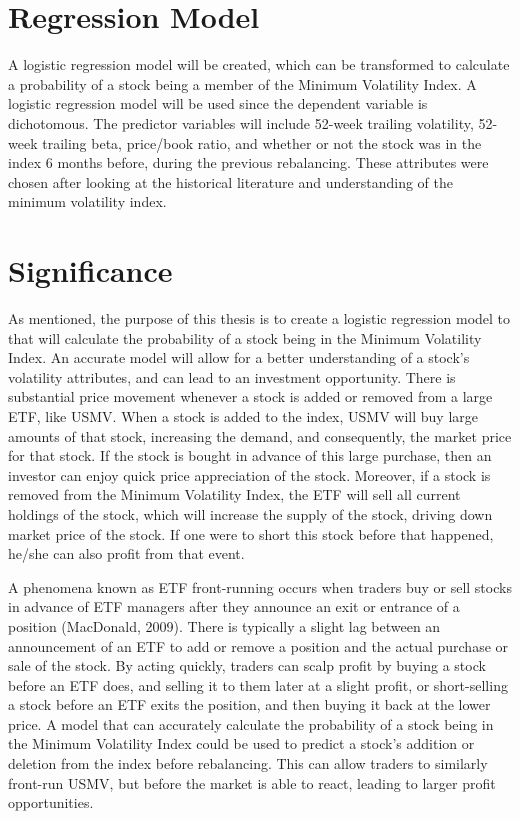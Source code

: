 \documentclass[12pt,twoside]{reedthesis}
\theoremstyle{definition}
\theoremstyle{definition}
\theoremstyle{definition}
\theoremstyle{remark}
\begin{document}
\section{Regression Model}\label{regression-model}

A logistic regression model will be created, which can be transformed to
calculate a probability of a stock being a member of the Minimum
Volatility Index. A logistic regression model will be used since the
dependent variable is dichotomous. The predictor variables will include
52-week trailing volatility, 52-week trailing beta, price/book ratio,
and whether or not the stock was in the index 6 months before, during
the previous rebalancing. These attributes were chosen after looking at
the historical literature and understanding of the minimum volatility
index.

\section{Significance}\label{significance}

As mentioned, the purpose of this thesis is to create a logistic
regression model to that will calculate the probability of a stock being
in the Minimum Volatility Index. An accurate model will allow for a
better understanding of a stock's volatility attributes, and can lead to
an investment opportunity. There is substantial price movement whenever
a stock is added or removed from a large ETF, like USMV. When a stock is
added to the index, USMV will buy large amounts of that stock,
increasing the demand, and consequently, the market price for that
stock. If the stock is bought in advance of this large purchase, then an
investor can enjoy quick price appreciation of the stock. Moreover, if a
stock is removed from the Minimum Volatility Index, the ETF will sell
all current holdings of the stock, which will increase the supply of the
stock, driving down market price of the stock. If one were to short this
stock before that happened, he/she can also profit from that event.

A phenomena known as ETF front-running occurs when traders buy or sell
stocks in advance of ETF managers after they announce an exit or
entrance of a position (MacDonald, 2009). There is typically a slight
lag between an announcement of an ETF to add or remove a position and
the actual purchase or sale of the stock. By acting quickly, traders can
scalp profit by buying a stock before an ETF does, and selling it to
them later at a slight profit, or short-selling a stock before an ETF
exits the position, and then buying it back at the lower price. A model
that can accurately calculate the probability of a stock being in the
Minimum Volatility Index could be used to predict a stock's addition or
deletion from the index before rebalancing. This can allow traders to
similarly front-run USMV, but before the market is able to react,
leading to larger profit opportunities.
\end{document}
